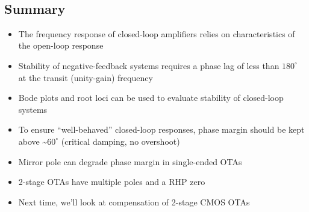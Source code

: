 \documentclass[11pt]{article}
\providecommand{\tightlist}{%
      \setlength{\itemsep}{0pt}\setlength{\parskip}{0pt}}
\begin{document}
    \begin{center}
    \end{center}
    { \hspace*{\fill} \\}
    
    \hypertarget{summary}{%
\subsection{Summary}\label{summary}}

    \begin{itemize}
\tightlist
\item
  The frequency response of closed-loop amplifiers relies on
  characteristics of the open-loop response
\item
  Stability of negative-feedback systems requires a phase lag of less
  than \(180^{\circ}\) at the transit (unity-gain) frequency
\item
  Bode plots and root loci can be used to evaluate stability of
  closed-loop systems
\item
  To ensure ``well-behaved'' closed-loop responses, phase margin should
  be kept above \textasciitilde{}\(60^{\circ}\) (critical damping, no
  overshoot)
\item
  Mirror pole can degrade phase margin in single-ended OTAs
\item
  2-stage OTAs have multiple poles and a RHP zero
\item
  Next time, we'll look at compensation of 2-stage CMOS OTAs
\end{itemize}


    
    
    
\end{document}
